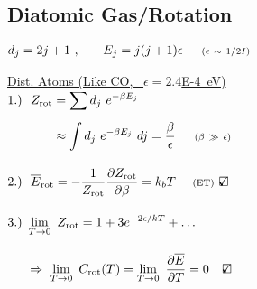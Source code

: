 \documentclass[12pt]{article}
\newcommand{\checkedbox}{\mbox{\ooalign{$\checkmark$\cr\hidewidth$\square$\hidewidth\cr}}} %
\begin{document}
\vspace{10pt}
\subsection{Diatomic Gas/Rotation}
\(\begin{aligned}
    d_j &= 2j + 1 \ , & \quad E_j &= j(j+1) \epsilon \indent {\scriptstyle(\epsilon\ \sim\ 1/2I)}
\end{aligned}\)

\vspace{15pt}\noindent
\begin{minipage}[t]{.45\textwidth}
    \underline{Dist. Atoms (Like CO, \ \(\epsilon = 2.4\)E-4\ eV)}\\[5pt]
    \(\begin{aligned}[t]
        &1.)\ \ Z_\text{rot} \begin{aligned}[t]
            &= \sum d_j\ e^{-\beta E_j} \\[5pt]
            &\approx \displaystyle \int d_j\ e^{-\beta E_j}\ dj = \frac{\beta}{\epsilon} 
            \indent {\scriptstyle(\beta\ \gg\ \epsilon)}
        \end{aligned}\\[10pt]
        &2.)\ \ \overline{E}_\text{rot} = - \frac{1}{Z_\text{rot}} \frac{\partial Z_\text{rot}}{\partial \beta} 
            = k_b T \ \ \ \ \text{\scriptsize(ET)}\ \checkedbox\\[10pt]
        &3.)\ \begin{aligned}[t]
            &\lim_{T \rightarrow 0}\ Z_\text{rot} = 1
                + 3 e^{-2\epsilon / kT} + \dots\\[10pt]
            &\Rightarrow \ \lim_{T \rightarrow 0}\ C_\text{rot}(T) 
                = \lim_{T \rightarrow 0}\ \frac{\partial \overline{E}}{\partial T} = 0 \ \ \ \checkedbox
        \end{aligned}
    \end{aligned}\) 
\end{minipage}
\end{document}
